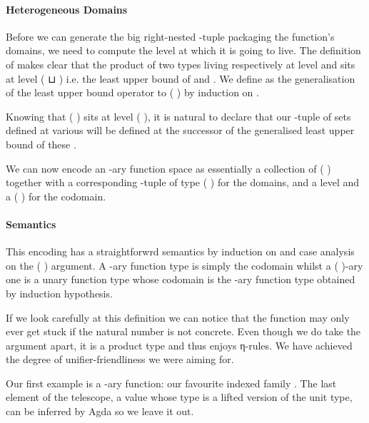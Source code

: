 
\paragraph{Heterogeneous Domains} Before we can generate the big right-nested
-tuple packaging the function's domains, we need to compute the level at
which it is going to live. The definition of  makes clear that the product
of two types living respectively at level  and  sits at level
{( ⊔ )} i.e. the least upper bound of  and .
We define  as the generalisation of the least upper bound operator
to {( )} by induction on .


Knowing that {( )} sits at level {( )}, it is
natural to declare that our -tuple of sets defined at various 
will be defined at the successor of the generalised least upper bound of these
.


We can now encode an -ary function space as essentially a collection 
of {( )} together with a corresponding -tuple of type
{(  )} for the domains, and a level  and a
{( )} for the codomain.

\paragraph{Semantics}\label{sec:semantics}
This encoding has a straightforwrd semantics by induction on  and case
analysis on the {(  )} argument. A -ary function
type is simply the codomain whilst a {( )}-ary one is a unary
function type whose codomain is the -ary function type obtained by
induction hypothesis.


If we look carefully at this definition we can notice that the function
 may only ever get stuck if the natural number is not concrete.
Even though we do take the  argument apart, it is a product type
and thus enjoys η-rules. We have achieved the degree of unifier-friendliness
we were aiming for.

Our first example is a -ary function: our favourite indexed family .
The last element of the telescope, a value whose type is a lifted version of the
unit type, can be inferred by Agda so we leave it out.

